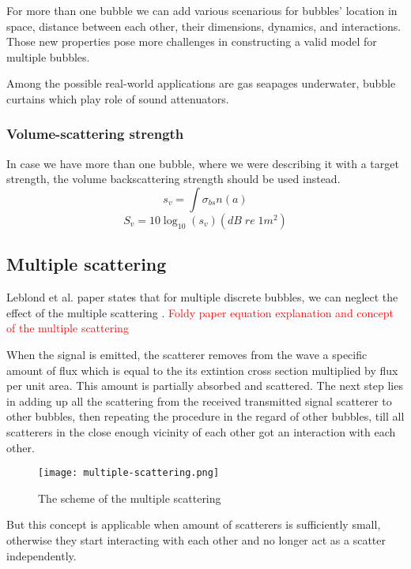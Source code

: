For more than one bubble we can add various scenarious for bubbles' location in space, distance between each other, their dimensions, dynamics, and interactions. Those new properties pose more challenges in constructing a valid model for multiple bubbles.

Among the possible real-world applications are gas seapages underwater, bubble curtains which play role of sound attenuators.


\subsubsection{Volume-scattering strength} 
In case we have more than one bubble, where we were describing it with a target strength, the volume backscattering strength should be used instead.
\[s_v = \int\sigma_{bs}n(a)\]
\[S_v = 10\log_{10}(s_v)(dB\;re\;1m^2)\]


\subsection{Multiple scattering }

Leblond et al. paper states that for multiple discrete bubbles, we can neglect the effect of the multiple scattering \cite[]{leblond_acoustic_2014}. 
\textcolor{red}{Foldy paper equation explanation and concept of the multiple scattering}

When the signal is emitted, the scatterer removes from the wave a specific amount of flux which is equal to the its extintion cross section multiplied by flux per unit area. This amount is partially absorbed and scattered. The next step lies in adding up all the scattering from the received transmitted signal scatterer to other bubbles, then repeating the procedure in the regard of other bubbles, till all scatterers in the close enough vicinity of each other got an interaction with each other.

\begin{figure}[H]
    \centering
    \texttt{[image: multiple-scattering.png]}
    \caption*{The scheme of the multiple scattering}
    \label{fig:multiple-scattering}
\end{figure}

But this concept is applicable when amount of scatterers is sufficiently small, otherwise they start interacting with each other and no longer act as a scatter independently. %


